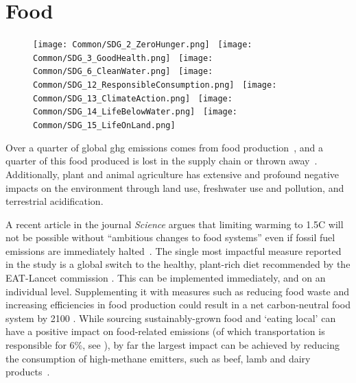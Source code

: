 \documentclass[../SustainableHEP.tex]{subfiles}
\begin{document}
\RaggedRight
\sloppy
\newpage


\section{Food}
\label{sec:Food}

\begin{figure}
\texttt{[image: Common/SDG\_2\_ZeroHunger.png]}~%
\texttt{[image: Common/SDG\_3\_GoodHealth.png]}~%
\texttt{[image: Common/SDG\_6\_CleanWater.png]}~%
\texttt{[image: Common/SDG\_12\_ResponsibleConsumption.png]}~%
\texttt{[image: Common/SDG\_13\_ClimateAction.png]}~%
\texttt{[image: Common/SDG\_14\_LifeBelowWater.png]}~%
\texttt{[image: Common/SDG\_15\_LifeOnLand.png]}
\end{figure}


\exSum

\noindent Over a quarter of global \acrshort{ghg} emissions comes from food production~\cite{USEPA}, and a quarter of this food produced is lost in the supply chain or thrown away~\cite{Searchinger2018}.  Additionally, plant and animal agriculture has extensive and profound negative impacts on the environment through land use, freshwater use and pollution, and terrestrial acidification. 

A recent article in the journal \textit{Science} argues that limiting warming to 1.5\degree C will not be possible without ``ambitious changes to food systems'' even if fossil fuel emissions are immediately halted~\cite{Clark370}.  The single most impactful measure reported in the study is a global switch to the healthy, plant-rich diet recommended by the EAT-Lancet commission \cite{WILLETT2019447}. This can be implemented immediately, and on an individual level.  Supplementing it with measures such as reducing food waste and increasing efficiencies in food production could result in a net carbon-neutral food system by 2100 \cite{Clark370}.
While sourcing sustainably-grown food and `eating local' can have a positive impact on food-related emissions (of which transportation is responsible for 6\%, see ), by far the largest impact can be achieved by reducing the consumption of high-methane emitters, such as beef, lamb and dairy products~\cite{PooreNemecek2018,OWID-Sustainable,OWID-Local}.
\end{document}
